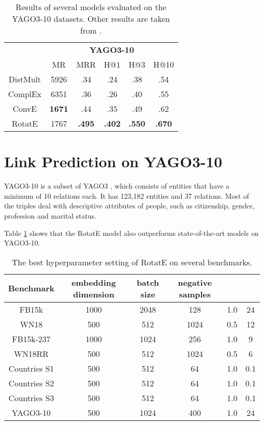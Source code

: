 \documentclass{article} \usepackage{iclr2019_conference,times}
\def\method{RotatE}
\begin{document}
\begin{table}[t]
\centering
\begin{tabular}{|c|c c c c c|}
\hline
& \multicolumn{5}{c|}{\textbf{YAGO3-10}}\\
\cline{2-6}
& MR & MRR & H@1 & H@3 & H@10\\
\hline
DistMult & 5926 & .34 & .24 & .38 & .54\\
\hline
ComplEx & 6351 & .36 & .26 & .40 & .55\\
\hline
ConvE & \textbf{1671} & .44 & .35 & .49 & .62\\
\hline
\hline
\method{} & 1767 & \textbf{.495} & \textbf{.402} & \textbf{.550} & \textbf{.670} \\
\hline
\end{tabular}
\caption{Results of several models evaluated on the YAGO3-10 datasets. Other results are taken from \citep{dettmers2017convolutional}.}
\label{tab:yago}
\end{table}

\section{Link Prediction on YAGO3-10}
YAGO3-10 is a subset of YAGO3 \citep{mahdisoltani2013yago3}, which consists of entities that have a minimum of 10 relations each. It has 123,182 entities and 37 relations. Most of the triples deal with descriptive attributes of people, such as citizenship, gender, profession and marital status.

Table \ref{tab:yago} shows that the \method{} model also outperforms state-of-the-art models on YAGO3-10.

\begin{table}[t]
\centering
\begin{tabular}{|c|c c c c c|}
\hline
Benchmark & embedding dimension  & batch size  & negative samples  &  &  \\
\hline
FB15k & 1000 & 2048 & 128 & 1.0 & 24 \\
\hline
WN18 & 500 & 512 & 1024 & 0.5 & 12 \\
\hline
FB15k-237 & 1000 & 1024 & 256 & 1.0 & 9 \\
\hline
WN18RR & 500 & 512 & 1024 & 0.5 & 6 \\
\hline
Countries S1 & 500 & 512 & 64 & 1.0 & 0.1 \\
\hline
Countries S2 & 500 & 512 & 64 & 1.0 & 0.1 \\
\hline
Countries S3 & 500 & 512 & 64 & 1.0 & 0.1 \\
\hline
YAGO3-10 & 500 & 1024 & 400 & 1.0 & 24 \\
\hline
\end{tabular}
\caption{The best hyperparameter setting of \method{} on several benchmarks.}
\label{tab:hyper}
\end{table}
\end{document}
